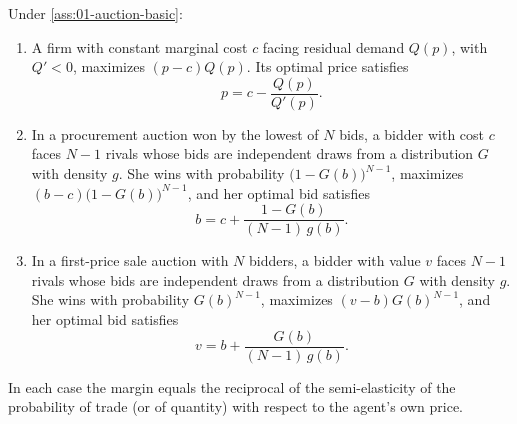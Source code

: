 \begin{proposition}\label{prop:01-unified-markup}
Under \cref{ass:01-auction-basic}:
\begin{enumerate}[label=(\roman*)]
  \item A firm with constant marginal cost $c$ facing residual demand $Q(p)$, with $Q' < 0$, maximizes
        $(p - c)Q(p)$. Its optimal price satisfies
        \begin{equation}\label{eq:01-unified-price}
          p = c - \frac{Q(p)}{Q'(p)} .
        \end{equation}
  \item In a procurement auction won by the lowest of $N$ bids, a bidder with cost $c$ faces $N - 1$ rivals
        whose bids are independent draws from a distribution $G$ with density $g$. She wins with
        probability $\big(1 - G(b)\big)^{N-1}$, maximizes $(b - c)\big(1 - G(b)\big)^{N-1}$, and her optimal bid
        satisfies
        \begin{equation}\label{eq:01-unified-procurement}
          b = c + \frac{1 - G(b)}{(N - 1)\,g(b)} .
        \end{equation}
  \item In a first-price sale auction with $N$ bidders, a bidder with value $v$ faces $N - 1$ rivals whose
        bids are independent draws from a distribution $G$ with density $g$. She wins with probability
        $G(b)^{N-1}$, maximizes $(v - b)G(b)^{N-1}$, and her optimal bid satisfies
        \begin{equation}\label{eq:01-unified-sale}
          v = b + \frac{G(b)}{(N - 1)\,g(b)} .
        \end{equation}
\end{enumerate}
In each case the margin equals the reciprocal of the semi-elasticity of the probability of trade (or of
quantity) with respect to the agent's own price.
\end{proposition}

